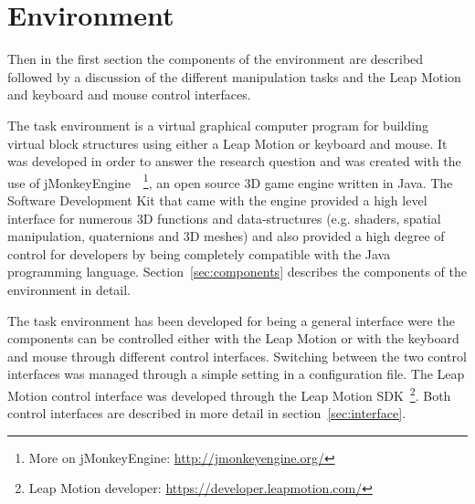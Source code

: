 \section{Environment}

Then in the first section the components of the environment are described followed by a discussion of the different manipulation tasks and the Leap Motion and keyboard and mouse 
control interfaces.

The task environment is a virtual graphical computer program for building virtual block structures using either a Leap Motion or keyboard and mouse. It was developed in order 
to answer the research question and was created with the use of jMonkeyEngine~\cite{Irene:2012}~\footnote{More on jMonkeyEngine: \url{http://jmonkeyengine.org/}}, an open source 
3D game engine written in Java. The Software Development Kit that came with the engine provided a high level interface for numerous 3D functions and data-structures (e.g. shaders, 
spatial manipulation, quaternions and 3D meshes) and also provided a high degree of control for developers by being completely compatible with the Java programming language. 
Section~\ref{sec:components} describes the components of the environment in detail.

The task environment has been developed for being a general interface were the components can be controlled either with the Leap Motion or with the keyboard and mouse through different 
control interfaces. Switching between the two control interfaces was managed through a simple setting in a configuration file. The Leap Motion control interface was developed through 
the Leap Motion SDK~\footnote{Leap Motion developer: \url{https://developer.leapmotion.com/}}. Both control interfaces are described in more detail in section~\ref{sec:interface}.





